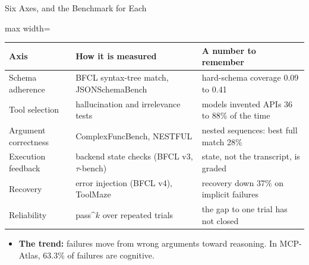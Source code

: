 \begin{frame}{Six Axes, and the Benchmark for Each}
    \begin{center}
    \small
    \renewcommand{\arraystretch}{1.12}
    \begin{adjustbox}{max width=\linewidth}\begin{tabular}{>{\raggedright\arraybackslash}p{3.0cm}>{\raggedright\arraybackslash}p{4.9cm}>{\raggedright\arraybackslash}p{5.3cm}}
        \toprule
        \textbf{Axis} & \textbf{How it is measured} & \textbf{A number to remember} \\
        \midrule
        Schema adherence & BFCL syntax-tree match, JSONSchemaBench & hard-schema coverage 0.09 to 0.41 \\
        Tool selection & hallucination and irrelevance tests & 2023 models invented APIs 36 to 88\% of the time \\
        Argument correctness & ComplexFuncBench, NESTFUL & nested sequences: best full match 28\% \\
        Execution feedback & backend state checks (BFCL v3, $\tau$-bench) & state, not the transcript, is graded \\
        Recovery & error injection (BFCL v4), ToolMaze & recovery down 37\% on implicit failures \\
        \rowcolor{KAUSTcyan!12} Reliability & pass\textasciicircum$k$ over repeated trials & the gap to one trial has not closed \\
        \bottomrule
    \end{tabular}\end{adjustbox}
    \end{center}
    \begin{itemize}
        \item \textbf{The trend:} failures move from wrong arguments toward reasoning. In MCP-Atlas, 63.3\% of failures are cognitive.
    \end{itemize}
\end{frame}

